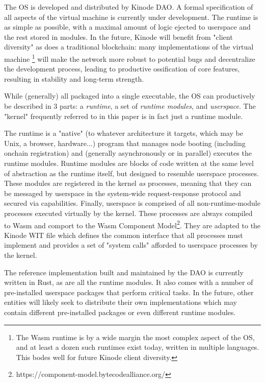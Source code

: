 \documentclass[runningheads]{llncs}
\begin{document}
The OS is developed and distributed by Kinode DAO. A formal specification of all aspects of the virtual machine is currently under development.
The runtime is as simple as possible, with a maximal amount of logic ejected to userspace and the rest stored in modules.
In the future, Kinode will benefit from "client diversity" as does a traditional blockchain: many implementations of the virtual machine
\footnote{The Wasm runtime is by a wide margin the most complex aspect of the OS, and at least a dozen such runtimes exist today, written in multiple languages.
This bodes well for future Kinode client diversity.}
will make the network more robust to potential bugs and decentralize the development process, leading to productive ossification of core features, resulting in stability and long-term strength.

While (generally) all packaged into a single executable, the OS can productively be described in 3 parts: a \textit{runtime}, a set of \textit{runtime modules}, and \textit{userspace}.
The "kernel" frequently referred to in this paper is in fact just a runtime module.

The runtime is a "native" (to whatever architecture it targets, which may be Unix, a browser, hardware...) program that manages node booting (including onchain registration) and (generally asynchronously or in parallel) executes the runtime modules.
Runtime modules are blocks of code written at the same level of abstraction as the runtime itself, but designed to resemble userspace processes.
These modules are registered in the kernel \textit{as} processes, meaning that they can be messaged by userspace in the system-wide request-response protocol and secured via capabilities.
Finally, userspace is comprised of all non-runtime-module processes executed virtually by the kernel.
These processes are always compiled to Wasm and comport to the Wasm Component Model\footnote{https://component-model.bytecodealliance.org/}.
They are adapted to the Kinode WIT file which defines the common interface that all processes must implement and provides a set of "system calls" afforded to userspace processes by the kernel.

The reference implementation built and maintained by the DAO is currently written in Rust, as are all the runtime modules.
It also comes with a number of pre-installed userspace packages that perform critical tasks.
In the future, other entities will likely seek to distribute their own implementations which may contain different pre-installed packages or even different runtime modules.
\end{document}
